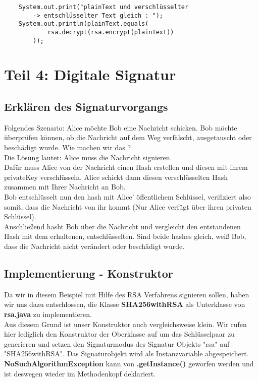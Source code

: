 \documentclass[12pt]{article}
\begin{document}
\begin{lstlisting}
    System.out.print("plainText und verschlüsselter
        -> entschlüsselter Text gleich : ");
    System.out.println(plainText.equals(
            rsa.decrypt(rsa.encrypt(plainText))
        ));
\end{lstlisting}




\newpage

\section{Teil 4: Digitale Signatur}

\subsection{Erklären des Signaturvorgangs}

Folgendes Szenario:
Alice möchte Bob eine Nachricht schicken. Bob möchte überprüfen können, ob die Nachricht auf dem Weg verfälscht, ausgetauscht oder beschädigt wurde. Wie machen wir das ? \\
Die Lösung lautet: Alice muss die Nachricht signieren.\\
Dafür muss Alice von der Nachricht einen Hash erstellen und diesen mit ihrem privateKey verschlüsseln. Alice schickt dann diesen verschlüsselten Hash zusammen mit Ihrer Nachricht an Bob. \\
Bob entschlüsselt nun den hash mit Alice' öffentlichem Schlüssel, verifiziert also somit, dass die Nachricht von ihr kommt (Nur Alice verfügt über ihren privaten Schlüssel). \\
Anschließend hasht Bob über die Nachricht und vergleicht den entstandenen Hash mit dem erhaltenen, entschlüsselten. Sind beide hashes gleich, weiß Bob, dass die Nachricht nicht verändert oder beschädigt wurde.

\subsection{Implementierung - Konstruktor}

Da wir in diesem Beispiel mit Hilfe des RSA Verfahrens signieren sollen, haben wir uns dazu entschlossen, die Klasse \textbf{SHA256withRSA} als Unterklasse von \textbf{rsa.java} zu implementieren. \\
Aus diesem Grund ist unser Konstruktor auch vergleichsweise klein. Wir rufen hier lediglich den Konstruktor der Oberklasse auf um das Schlüsselpaar zu generieren und setzen den Signaturmodus des Signatur Objekts "rsa" auf "SHA256withRSA". Das Signaturobjekt wird als Instanzvariable abgespeichert. \\
\textbf{NoSuchAlgorithmException} kann von \textbf{.getInstance()} geworfen werden und ist deswegen wieder im Methodenkopf deklariert.
\end{document}
